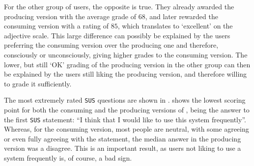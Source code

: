 For the other group of users, the opposite is true. They already awarded the producing version with the average grade of $68$, and later rewarded the consuming version with a rating of $85$, which translates to `excellent' on the adjective scale. This large difference can possibly be explained by the users preferring the consuming version over the producing one and therefore, consciously or unconsciously, giving higher grades to the consuming version. The lower, but still `OK' grading of the producing version in the other group can then be explained by the users still liking the producing version, and therefore willing to grade it sufficiently.

The most extremely rated \verb|SUS| questions are shown in .  shows the lowest scoring point for both the consuming and the producing versions of \oframp, being the answer to the first \verb|SUS| statement: ``I think that I would like to use this system frequently''. Whereas, for the consuming version, most people are neutral, with some agreeing or even fully agreeing with the statement, the median answer in the producing version was a disagree. This is an important result, as users not liking to use a system frequently is, of course, a bad sign.

